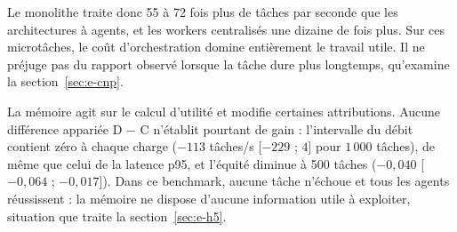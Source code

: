 
\begin{table}[H]
\centering
\caption{Débit moyen du benchmark A--D (tâches/s) et IC à 95~\%, dix répétitions par charge.}
\label{tab:benchmark-debit}
\small
{}
\end{table}

Le monolithe traite donc 55 à 72 fois plus de tâches par seconde que les architectures à agents, et les workers centralisés une dizaine de fois plus. Sur ces microtâches, le coût d'orchestration domine entièrement le travail utile. Il ne préjuge pas du rapport observé lorsque la tâche dure plus longtemps, qu'examine la section~\ref{sec:e-cnp}.

La mémoire agit sur le calcul d'utilité et modifie certaines attributions. Aucune différence appariée D $-$ C n'établit pourtant de gain : l'intervalle du débit contient zéro à chaque charge ($-113$ tâches/s [$-229$ ; $4$] pour $1\,000$ tâches), de même que celui de la latence p95, et l'équité diminue à 500 tâches ($-0{,}040$ [$-0{,}064$ ; $-0{,}017$]). Dans ce benchmark, aucune tâche n'échoue et tous les agents réussissent : la mémoire ne dispose d'aucune information utile à exploiter, situation que traite la section~\ref{sec:e-h5}.
